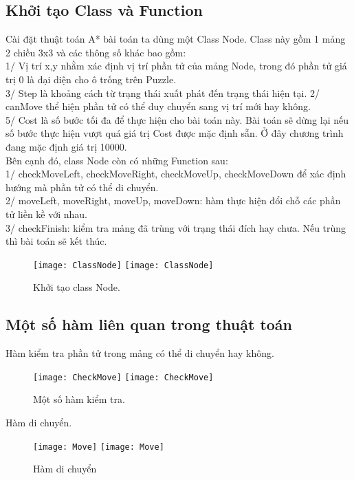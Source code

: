 \subsection{Khởi tạo Class và Function}
Cài đặt thuật toán A* bài toán ta dùng một Class Node. Class này gồm 1 mảng 2 chiều 3x3 và các thông số khác bao gồm: \\
1/ Vị trí x,y nhằm xác định vị trí phần tử của mảng Node, trong đó phần tử giá trị 0 là đại diện cho ô trống trên Puzzle.\\
3/ Step là khoảng cách từ trạng thái xuất phát đến trạng thái hiện tại.
2/ canMove thể hiện phần tử có thể duy chuyển sang vị trí mới hay không.\\
5/ Cost là số bước tối đa để thực hiện cho bài toán này. Bài toán sẽ dừng lại nếu số bước thực hiện vượt quá giá trị Cost được mặc định sẵn. Ở đây chương trình đang mặc định giá trị 10000.\\
Bên cạnh đó, class Node còn có những Function sau:\\
1/ checkMoveLeft, checkMoveRight, checkMoveUp, checkMoveDown để xác định hướng mà phần tử có thể di chuyển.\\
2/ moveLeft, moveRight, moveUp, moveDown: hàm thực hiện đổi chỗ các phần tử liền kề với nhau.\\
3/ checkFinish: kiểm tra mảng đã trùng với trạng thái đích hay chưa. Nếu trùng thì bài toán sẽ kết thúc.
\begin{figure}[!htbp]
  \begin{center}
    \leavevmode
    \ifpdf
      \texttt{[image: ClassNode]}
    \else
      \texttt{[image: ClassNode]}
    \fi
    \caption{Khởi tạo class Node.}
    \label{FigAir}
   
  \end{center}
\end{figure}
\FloatBarrier

\subsection{Một số hàm liên quan trong thuật toán}
Hàm kiểm tra phần tử trong mảng có thể di chuyển hay không.\\
\begin{figure}[!htbp]
  \begin{center}
    \leavevmode
    \ifpdf
      \texttt{[image: CheckMove]}
    \else
      \texttt{[image: CheckMove]}
    \fi
    \caption{Một số hàm kiểm tra.}
    \label{FigAir}
   
  \end{center}
\end{figure}
\FloatBarrier
Hàm di chuyển.\\
\begin{figure}[!htbp]
  \begin{center}
    \leavevmode
    \ifpdf
      \texttt{[image: Move]}
    \else
      \texttt{[image: Move]}
    \fi
    \caption{Hàm di chuyển}
    \label{FigAir}
   
  \end{center}
\end{figure}
\FloatBarrier


